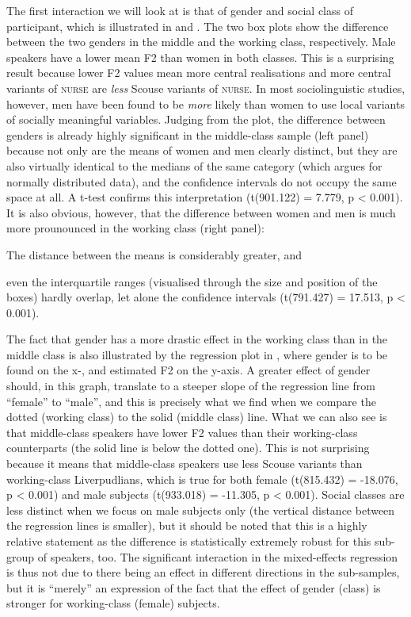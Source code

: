 The first interaction we will look at is that of gender and social class of participant, which is illustrated in  and .
The two box plots show the difference between the two genders in the middle and the working class, respectively.
Male speakers have a lower mean F2 than women in both classes.
This is a surprising result because lower F2 values mean more central realisations and more central variants of \textsc{nurse} are \emph{less} Scouse variants of \textsc{nurse}.
In most sociolinguistic studies, however, men have been found to be \emph{more} likely than women to use local variants of socially meaningful variables.
Judging from the plot, the difference between genders is already highly significant in the middle-class sample (left panel) because not only are the means of women and men clearly distinct, but they are also virtually identical to the medians of the same category (which argues for normally distributed data), and the confidence intervals do not occupy the same space at all.
A t-test confirms this interpretation (t(901.122) = 7.779, p < 0.001).
It is also obvious, however, that the difference between women and men is much more prounounced in the working class (right panel):
\begin{inparaenum}[(a)]
	\item The distance between the means is considerably greater, and
	\item even the interquartile ranges (visualised through the size and position of the boxes) hardly overlap, let alone the confidence intervals (t(791.427) = 17.513, p < 0.001).
\end{inparaenum}

The fact that gender has a more drastic effect in the working class than in the middle class is also illustrated by the regression plot in , where gender is to be found on the x-, and estimated F2 on the y-axis.
A greater effect of gender should, in this graph, translate to a steeper slope of the regression line from ``female'' to ``male'', and this is precisely what we find when we compare the dotted (working class) to the solid (middle class) line.
What we can also see is that middle-class speakers have lower F2 values than their working-class counterparts (the solid line is below the dotted one).
This is not surprising because it means that middle-class speakers use less Scouse variants than working-class Liverpudlians, which is true for both female (t(815.432) = -18.076, p < 0.001) and male subjects (t(933.018) = -11.305, p < 0.001).
Social classes are less distinct when we focus on male subjects only (the vertical distance between the regression lines is smaller), but it should be noted that this is a highly relative statement as the difference is statistically extremely robust for this sub-group of speakers, too.
The significant interaction in the mixed-effects regression is thus not due to there being an effect in different directions in the sub-samples, but it is ``merely'' an expression of the fact that the effect of gender (class) is stronger for working-class (female) subjects.

